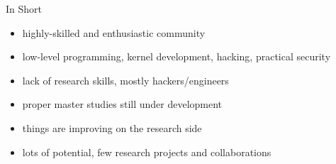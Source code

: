 \documentclass{beamer}
\begin{document}
\begin{frame}{In Short}
  \begin{itemize}
    \item highly-skilled and enthusiastic community
    \item low-level programming, kernel development, hacking, practical
      security
    \item lack of research skills, mostly hackers/engineers
    \item proper master studies still under development
    \item things are improving on the research side
    \item lots of potential, few research projects and collaborations
  \end{itemize}
\end{frame}
\end{document}
